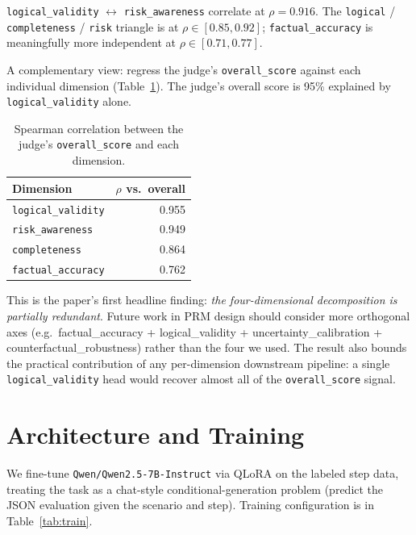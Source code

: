 \documentclass[10pt,letterpaper]{article}
\begin{document}
\texttt{logical\_validity} $\leftrightarrow$ \texttt{risk\_awareness} correlate at $\rho = 0.916$. The \texttt{logical} / \texttt{completeness} / \texttt{risk} triangle is at $\rho \in [0.85, 0.92]$; \texttt{factual\_accuracy} is meaningfully more independent at $\rho \in [0.71, 0.77]$.

A complementary view: regress the judge's \texttt{overall\_score} against each individual dimension (Table~\ref{tab:explain}). The judge's overall score is 95\% explained by \texttt{logical\_validity} alone.

\begin{table}[!ht]
\centering
\small
\caption{Spearman correlation between the judge's \texttt{overall\_score} and each dimension.}
\label{tab:explain}
\begin{tabular}{lr}
\toprule
Dimension & $\rho$ vs.\ overall \\
\midrule
\texttt{logical\_validity}   & 0.955 \\
\texttt{risk\_awareness}     & 0.949 \\
\texttt{completeness}        & 0.864 \\
\texttt{factual\_accuracy}   & 0.762 \\
\bottomrule
\end{tabular}
\end{table}

This is the paper's first headline finding: \emph{the four-dimensional decomposition is partially redundant}. Future work in PRM design should consider more orthogonal axes (e.g.\ factual\_accuracy + logical\_validity + uncertainty\_calibration + counterfactual\_robustness) rather than the four we used. The result also bounds the practical contribution of any per-dimension downstream pipeline: a single \texttt{logical\_validity} head would recover almost all of the \texttt{overall\_score} signal.

\section{Architecture and Training}
\label{sec:training}

We fine-tune \texttt{Qwen/Qwen2.5-7B-Instruct} via QLoRA on the labeled step data, treating the task as a chat-style conditional-generation problem (predict the JSON evaluation given the scenario and step). Training configuration is in Table~\ref{tab:train}.
\end{document}
